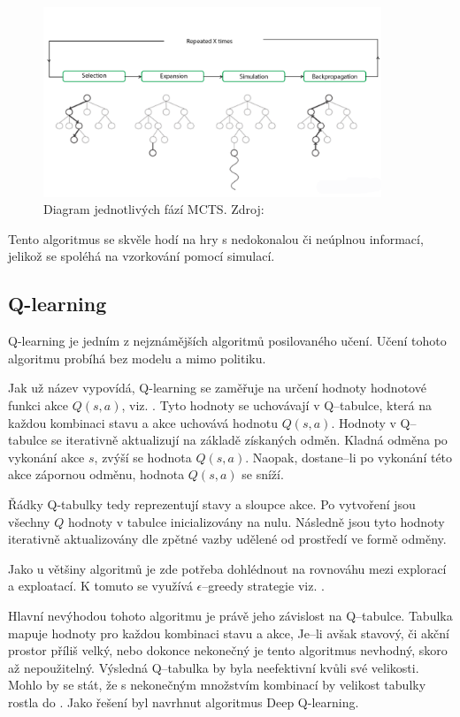 \begin{figure}[H]
	\centering
	\includegraphics[width=0.9\textwidth]{obrazky-figures/mcts}
	\caption{Diagram jednotlivých fází MCTS.
  Zdroj: \cite{Monte_Carlo_Tree_Search}}\label{fig:mcts}
\end{figure}

Tento algoritmus se skvěle hodí na hry s nedokonalou či neúplnou informací, jelikož se spoléhá na vzorkování pomocí simulací.

\subsection{Q-learning}\label{subsec:q-learning}

Q-learning je jedním z nejznámějších algoritmů posilovaného učení.
Učení tohoto algoritmu probíhá bez modelu a mimo politiku.

Jak už název vypovídá, Q-learning se zaměřuje na určení hodnoty hodnotové funkci akce $Q(s, a)$, viz. .
Tyto hodnoty se uchovávají v Q--tabulce, která na každou kombinaci stavu a akce uchovává hodnotu $Q(s, a)$.
Hodnoty v Q--tabulce se iterativně aktualizují na základě získaných odměn.
Kladná odměna po vykonání akce $s$, zvýší se hodnota $Q(s, a)$.
Naopak, dostane--li po vykonání této akce zápornou odměnu, hodnota $Q(s, a)$ se sníží.

Řádky Q-tabulky tedy reprezentují stavy a sloupce akce.
Po vytvoření jsou všechny $Q$ hodnoty v tabulce inicializovány na nulu.
Následně jsou tyto hodnoty iterativně aktualizovány dle zpětné vazby udělené od prostředí ve formě odměny.

Jako u většiny algoritmů je zde potřeba dohlédnout na rovnováhu mezi explorací a exploatací.
K tomuto se využívá $\epsilon$--greedy strategie viz. .

Hlavní nevýhodou tohoto algoritmu je právě jeho závislost na Q--tabulce.
Tabulka mapuje hodnoty pro každou kombinaci stavu a akce,
Je--li avšak stavový, či akční prostor příliš velký, nebo dokonce nekonečný je tento algoritmus nevhodný, skoro až nepoužitelný.
Výsledná Q--tabulka by byla neefektivní kvůli své velikosti.
Mohlo by se stát, že s nekonečným množstvím kombinací by velikost tabulky rostla do .
Jako řešení byl navrhnut algoritmus Deep Q-learning.

